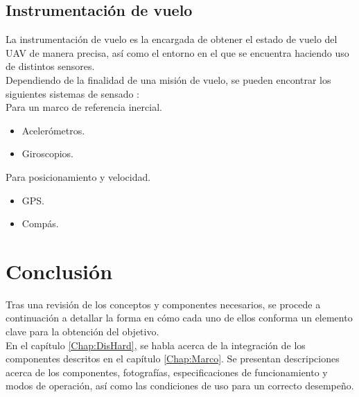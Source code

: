 \subsection{Instrumentación de vuelo}

La instrumentación de vuelo es la encargada de obtener el estado de vuelo del UAV de manera precisa, así como el entorno en el que se encuentra haciendo uso de distintos sensores.\\

Dependiendo de la finalidad de una misión de vuelo, se pueden encontrar los siguientes sistemas de sensado \citep{barrientos2007vehiculos}:\\

Para un marco de referencia inercial.
\begin{itemize}
\item Acelerómetros.
\item Giroscopios.
\end{itemize}
Para posicionamiento y velocidad.
\begin{itemize}
\item GPS.
\item Compás.
\end{itemize}

\section{Conclusión}

Tras una revisión de los conceptos y componentes necesarios, se procede a continuación a detallar la forma en cómo cada uno de ellos conforma un elemento clave para la obtención del objetivo.\\

En el capítulo \ref{Chap:DisHard}, se habla acerca de la integración de los componentes descritos en el capítulo \ref{Chap:Marco}. Se presentan descripciones acerca de los componentes, fotografías, especificaciones de funcionamiento y modos de operación, así como las condiciones de uso para un correcto desempeño. 